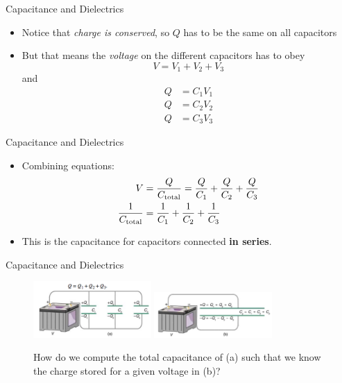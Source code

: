 \documentclass{beamer}
\begin{document}
\begin{frame}{Capacitance and Dielectrics}
\begin{itemize}
\item Notice that \textit{charge is conserved}, so $Q$ has to be the same on all capacitors
\item But that means the \textit{voltage} on the different capacitors has to obey
\begin{equation}
V = V_1 + V_2 + V_3
\end{equation}
and
\begin{align}
Q &= C_1 V_1 \\
Q &= C_2 V_2 \\
Q &= C_3 V_3
\end{align}
\end{itemize}
\end{frame}

\begin{frame}{Capacitance and Dielectrics}
\begin{itemize}
\item Combining equations:
\begin{align}
V &= \frac{Q}{C_{\rm total}} = \frac{Q}{C_1}+\frac{Q}{C_2}+\frac{Q}{C_3} \\
\frac{1}{C_{\rm total}} &= \frac{1}{C_1}+\frac{1}{C_2}+\frac{1}{C_3}
\end{align}
\item This is the capacitance for capacitors connected \textbf{in series}.
\end{itemize}
\end{frame}

\begin{frame}{Capacitance and Dielectrics}
\begin{figure}
\centering
\includegraphics[width=0.4\textwidth]{figures/cap3.png} \hspace{0.2cm}
\includegraphics[width=0.4\textwidth]{figures/cap4.png}
\caption{\label{fig:cap2} How do we compute the total capacitance of (a) such that we know the charge stored for a given voltage in (b)?}
\end{figure}
\end{frame}
\end{document}
